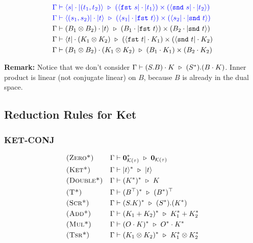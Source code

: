 \begin{align*}
  & \textcolor{blue}{\Gamma \vdash \langle s| \cdot |(t_1, t_2)\rangle \ \triangleright\  (\langle \texttt{fst}\ s| \cdot |t_1\rangle) \times (\langle \texttt{snd}\ s| \cdot |t_2\rangle)} \\
  & \textcolor{blue}{\Gamma \vdash \langle (s_1, s_2)| \cdot |t\rangle \ \triangleright\  (\langle s_1| \cdot |\texttt{fst}\ t\rangle) \times (\langle s_2| \cdot |\texttt{snd}\ t\rangle)} \\
  & \Gamma \vdash (B_1 \otimes B_2) \cdot |t\rangle \ \triangleright\  (B_1 \cdot |\texttt{fst}\ t\rangle) \times (B_2 \cdot |\texttt{snd}\ t\rangle) \\
  & \Gamma \vdash \langle t| \cdot (K_1 \otimes K_2) \ \triangleright\  (\langle \texttt{fst}\ t| \cdot K_1) \times (\langle \texttt{snd}\ t| \cdot K_2) \\
  & \Gamma \vdash (B_1 \otimes B_2) \cdot (K_1 \otimes K_2) \ \triangleright\  (B_1 \cdot K_1) \times (B_2 \cdot K_2)
\end{align*}

\textbf{Remark:} Notice that we don't consider $\Gamma \vdash (S.B) \cdot K \ \triangleright\  (S^*).(B \cdot K)$. Inner product is linear (not conjugate linear) on $B$, because $B$ is already in the dual space.






\subsection{Reduction Rules for Ket}

\subsubsection*{\textsf{KET-CONJ}}
\begin{align*}
  & \textsc{(Zero*)} && \Gamma \vdash \mathbf{0}_{\mathcal{K}(\tau)}^* \ \triangleright\  \mathbf{0}_{\mathcal{K}(\tau)} \\
  & \textsc{(Ket*)} && \Gamma \vdash |t\rangle^* \ \triangleright\  |t\rangle \\
  & \textsc{(Double*)} && \Gamma \vdash (K^*)^* \ \triangleright\  K \\
  & \textsc{(T*)} && \Gamma \vdash (B^\top)^* \ \triangleright\ (B^*)^\top \\
  & \textsc{(Scr*)} && \Gamma \vdash (S.K)^* \ \triangleright\  (S^*).(K^*) \\
  & \textsc{(Add*)} && \Gamma \vdash (K_1 + K_2)^* \ \triangleright\  K_1^* + K_2^* \\
  & \textsc{(Mul*)} && \Gamma \vdash (O \cdot K)^* \ \triangleright\  O^* \cdot K^* \\
  & \textsc{(Tsr*)} && \Gamma \vdash (K_1 \otimes K_2)^* \ \triangleright\  K_1^* \otimes K_2^*
\end{align*}

